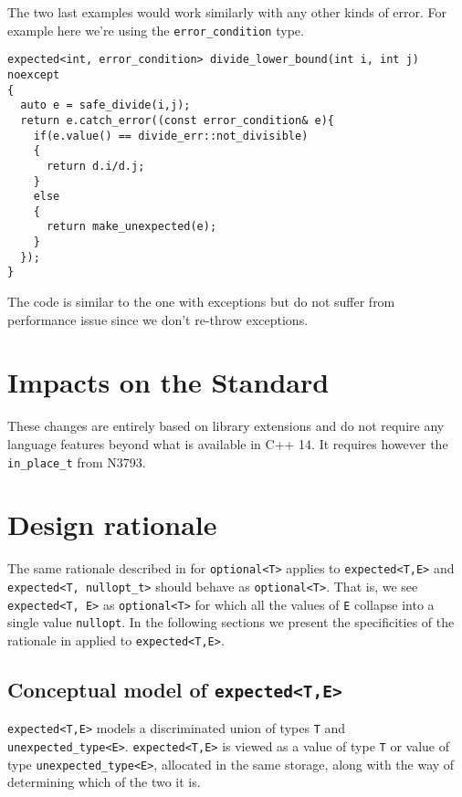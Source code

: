 \documentclass[a4paper,10pt]{article}
\newcommand{\cpp}[1]{\lstinline{#1}}
\begin{document}
The two last examples would work similarly with any other kinds of error. For example here we're using the \cpp{error_condition} type.

\begin{lstlisting}
expected<int, error_condition> divide_lower_bound(int i, int j) noexcept
{
  auto e = safe_divide(i,j);
  return e.catch_error((const error_condition& e){
    if(e.value() == divide_err::not_divisible)
    {
      return d.i/d.j;
    }
    else
    {
      return make_unexpected(e);
    }
  });
}
\end{lstlisting}

The code is similar to the one with exceptions but do not suffer from performance issue since we don't re-throw exceptions.

\section{Impacts on the Standard}

These changes are entirely based on library extensions and do not require any language features beyond what is available in C++ 14. It requires however the \cpp{in_place_t} from N3793.

\section{Design rationale}

The same rationale described in \cite{OptionalRev4} for \cpp{optional<T>} applies to \cpp{expected<T,E>} and \cpp{expected<T, nullopt_t>} should behave as \cpp{optional<T>}.  That is, we see \cpp{expected<T, E>} as \cpp{optional<T>} for which all the values of \cpp{E} collapse into a single value \cpp{nullopt}. In the following sections we present the specificities of the rationale in \cite{OptionalRev4} applied to  \cpp{expected<T,E>}.

\subsection{Conceptual model of \cpp{expected<T,E>}}

\cpp{expected<T,E>} models a discriminated union of types \cpp{T} and \cpp{unexpected_type<E>}. \cpp{expected<T,E>} is viewed as a value of type \cpp{T} or value of type \cpp{unexpected_type<E>}, allocated in the same storage, along with the way of determining which of the two it is. 
\end{document}

